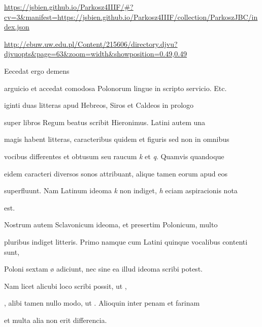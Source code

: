 
\newpage
\newParkoszpage

{
  \url{https://jsbien.github.io/Parkosz4IIIF/\#?cv=3&manifest=https://jsbien.github.io/Parkosz4IIIF/collection/ParkoszJBC/index.json}
  
\url{http://ebuw.uw.edu.pl/Content/215606/directory.djvu?djvuopts&page=63&zoom=width&showposition=0.49,0.49}
}
\fullpreviouslines


{
\color{blue}

Eecedat ergo demens

}



\fulllines{}

arguicio et accedat comodosa Polonorum lingue in scripto servicio. Etc.

iginti duas litteras apud Hebreos, Siros et Caldeos in prologo

super libros Regum beatus scribit Hieronimus. Latini autem una

magis habent litteras, caracteribus quidem et figuris sed non in omnibus

vocibus differentes et obtusum seu raucum \textit{k} et \textit{q}. Quamvis quandoque

eidem caracteri diversos sonos attribuant, alique tamen eorum apud eos

superfluunt. Nam Latinum ideoma \textit{k} non indiget, \textit{h} eciam aspiracionis nota

\splitlines{}

est.

\indentK Nostrum autem Sclavonicum ideoma, et presertim Polonicum, multo

\fulllines{}

pluribus indiget litteris. Primo namque cum Latini quinque vocalibus contenti sunt,

Poloni  sextam ø adiciunt, nec sine ea illud ideoma scribi potest.

Nam licet alicubi loco   scribi possit, ut  , 

, alibi tamen nullo modo, ut  . Alioquin inter penam et farinam

\splitlines{}

et multa alia non erit differencia.


